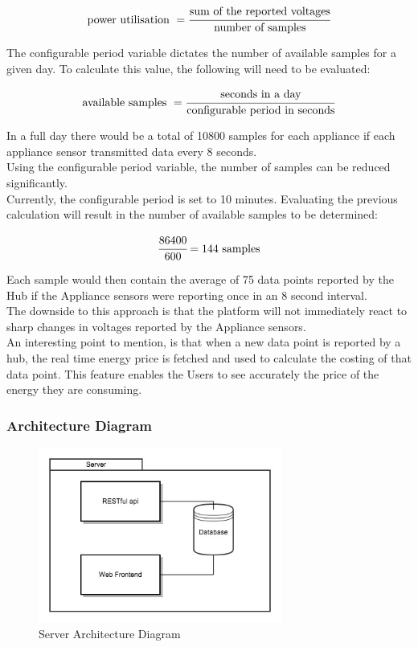 \documentclass[preprint,12pt,3p]{elsarticle}
\begin{document}
\begin{equation*} 
\text{power utilisation } = \cfrac{\text{sum of the reported voltages}}{\text{number of samples}}
\end{equation*}

The configurable period variable dictates the number of available samples for a given day. To calculate this value, the following will need to be evaluated:

\begin{equation*} 
\text{available samples } = \cfrac{\text{seconds in a day}}{\text{configurable period in seconds}}
\end{equation*}

In a full day there would be a total of 10800 samples for each appliance if each appliance sensor transmitted data every 8 seconds.\\
Using the configurable period variable, the number of samples can be reduced significantly.\\
Currently, the configurable period is set to 10 minutes. Evaluating the previous calculation will result in the number of available samples to be determined:

\begin{equation*} 
 \cfrac{86400}{\text{600}} = 144 \text{ samples}
\end{equation*}

Each sample would then contain the average of 75 data points reported by the Hub if the Appliance sensors were reporting once in an 8 second interval.\\
The downside to this approach is that the platform will not immediately react to sharp changes in voltages reported by the Appliance sensors. \\
An interesting point to mention, is that when a new data point is reported by a hub, the real time energy price is fetched and used to calculate the costing of that data point. This feature enables the Users to see accurately the price of the energy they are consuming. 

\subsubsection{Architecture Diagram}
\begin{figure}[H]
    \centering
    \includegraphics[width=8cm]{diagrams/server}
    \caption {Server Architecture Diagram}
\end{figure}
\end{document}
